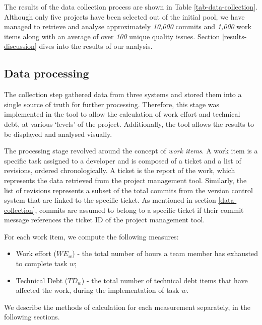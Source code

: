 \documentclass{mpaper}
\begin{document}
The results of the data collection process are shown in Table
\ref{tab-data-collection}. Although only five projects have been selected out of
the initial pool, we have managed to retrieve and analyse approximately
\emph{10,000} commits and \emph{1,000} work items along with an average of over
\emph{100} unique quality issues. Section \ref{results-discussion} dives into
the results of our analysis. 

\subsection{Data processing}
\label{data-processing}

The collection step gathered data from three systems and stored them into a
single source of truth for further processing. Therefore, this stage was
implemented in the tool to allow the calculation of work effort and technical
debt, at various `levels' of the project. Additionally, the tool allows the
results to be displayed and analysed visually.

The processing stage revolved around the concept of \emph{work items}. A work
item is a specific task assigned to a developer and is composed of a ticket and
a list of revisions, ordered chronologically. A ticket is the report of the
work, which represents the data retrieved from the project management tool.
Similarly, the list of revisions represents a subset of the total commits from
the version control system that are linked to the specific ticket. As mentioned
in section \ref{data-collection}, commits are assumed to belong to a specific
ticket if their commit message references the ticket ID of the project
management tool.

For each work item, we compute the following measures:
\begin{itemize}
  \item Work effort ($WE_{w}$) - the total number of hours a team member has
  exhausted to complete task $w$;
  \item Technical Debt ($TD_{w}$) - the total number of technical debt items
  that have affected the work, during the implementation of task $w$.
\end{itemize}

We describe the methods of calculation for each measurement separately, in the
following sections. 

\end{document}
